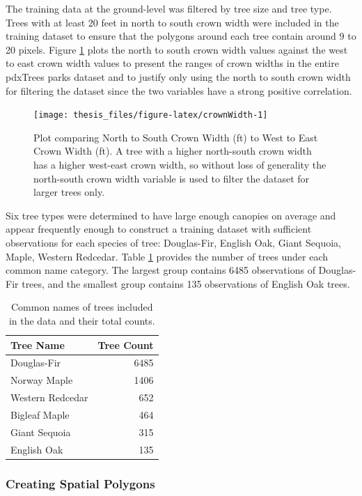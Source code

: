 \documentclass[12pt,twoside]{reedthesis}
\begin{document}
The training data at the ground-level was filtered by tree size and tree type. Trees with at least 20 feet in north to south crown width were included in the training dataset to ensure that the polygons around each tree contain around 9 to 20 pixels. Figure \ref{fig:crownWidth} plots the north to south crown width values against the west to east crown width values to present the ranges of crown widths in the entire pdxTrees parks dataset and to justify only using the north to south crown width for filtering the dataset since the two variables have a strong positive correlation.
\begin{figure}

{\centering \texttt{[image: thesis\_files/figure-latex/crownWidth-1]} 

}

\caption{Plot comparing North to South Crown Width (ft) to West to East Crown Width (ft). A tree with a higher north-south crown width has a higher west-east crown width, so without loss of generality the north-south crown width variable is used to filter the dataset for larger trees only.}\label{fig:crownWidth}
\end{figure}
Six tree types were determined to have large enough canopies on average and appear frequently enough to construct a training dataset with sufficient observations for each species of tree: Douglas-Fir, English Oak, Giant Sequoia, Maple, Western Redcedar. Table \ref{tab:pointsTable} provides the number of trees under each common name category. The largest group contains 6485 observations of Douglas-Fir trees, and the smallest group contains 135 observations of English Oak trees.
\begin{table}

\caption{\label{tab:pointsTable}Common names of trees included in the data and their total counts.}
\centering
\begin{tabular}[t]{l|r}
\hline
Tree Name & Tree Count\\
\hline
Douglas-Fir & 6485\\
\hline
Norway Maple & 1406\\
\hline
Western Redcedar & 652\\
\hline
Bigleaf Maple & 464\\
\hline
Giant Sequoia & 315\\
\hline
English Oak & 135\\
\hline
\end{tabular}
\end{table}
\hypertarget{creating-spatial-polygons}{%
\subsubsection{Creating Spatial Polygons}\label{creating-spatial-polygons}}
\end{document}
